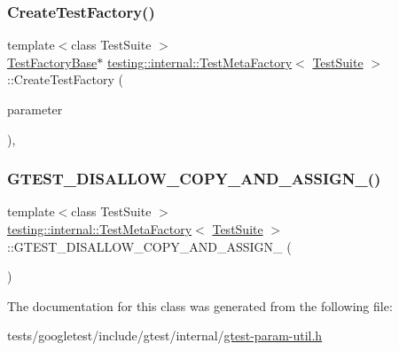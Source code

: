 \subsubsection{\texorpdfstring{Create\+Test\+Factory()}{CreateTestFactory()}}
{\footnotesize\ttfamily template$<$class Test\+Suite $>$ \\
\hyperlink{classtesting_1_1internal_1_1TestFactoryBase}{Test\+Factory\+Base}$\ast$ \hyperlink{classtesting_1_1internal_1_1TestMetaFactory}{testing\+::internal\+::\+Test\+Meta\+Factory}$<$ \hyperlink{classtesting_1_1TestSuite}{Test\+Suite} $>$\+::Create\+Test\+Factory (\begin{DoxyParamCaption}\item[{\hyperlink{classtesting_1_1internal_1_1TestMetaFactory_a392ebab15dfdcfa1b54bbe15878aa9cd}{Param\+Type}}]{parameter }\end{DoxyParamCaption})\hspace{0.3cm}{\ttfamily [inline]}, {\ttfamily [override]}}

\mbox{\label{classtesting_1_1internal_1_1TestMetaFactory_a058168d58de97a9d8dfb7400ad878148}} 
\subsubsection{\texorpdfstring{G\+T\+E\+S\+T\+\_\+\+D\+I\+S\+A\+L\+L\+O\+W\+\_\+\+C\+O\+P\+Y\+\_\+\+A\+N\+D\+\_\+\+A\+S\+S\+I\+G\+N\+\_\+()}{GTEST\_DISALLOW\_COPY\_AND\_ASSIGN\_()}}
{\footnotesize\ttfamily template$<$class Test\+Suite $>$ \\
\hyperlink{classtesting_1_1internal_1_1TestMetaFactory}{testing\+::internal\+::\+Test\+Meta\+Factory}$<$ \hyperlink{classtesting_1_1TestSuite}{Test\+Suite} $>$\+::G\+T\+E\+S\+T\+\_\+\+D\+I\+S\+A\+L\+L\+O\+W\+\_\+\+C\+O\+P\+Y\+\_\+\+A\+N\+D\+\_\+\+A\+S\+S\+I\+G\+N\+\_\+ (\begin{DoxyParamCaption}\item[{\hyperlink{classtesting_1_1internal_1_1TestMetaFactory}{Test\+Meta\+Factory}$<$ \hyperlink{classtesting_1_1TestSuite}{Test\+Suite} $>$}]{ }\end{DoxyParamCaption})\hspace{0.3cm}{\ttfamily [private]}}



The documentation for this class was generated from the following file\+:\begin{DoxyCompactItemize}
\item 
tests/googletest/include/gtest/internal/\hyperlink{gtest-param-util_8h}{gtest-\/param-\/util.\+h}\end{DoxyCompactItemize}

